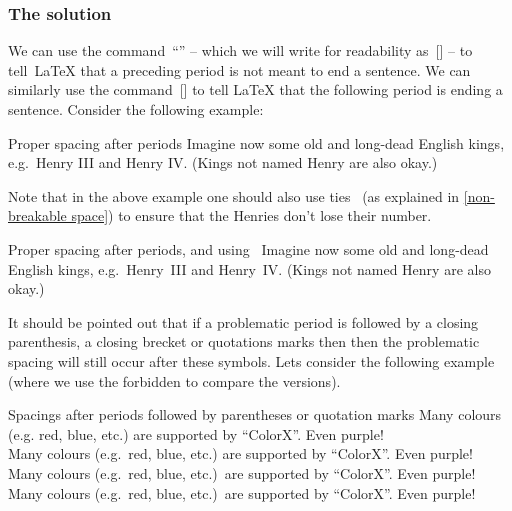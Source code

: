 \subsubsection{The solution}

We can use the command~\enquote{\comname{ }} -- which we will write for readability as~[\comname] -- to tell~{\LaTeX} that a preceding period is not meant to end a sentence.
We can similarly use the command~[\comname] to tell {\LaTeX} that the following period is ending a sentence.
Consider the following example:
\begin{showlatex}{Proper spacing after periods}
Imagine now some old and long-dead English kings, e.g.\ Henry III and Henry IV\@.
(Kings not named Henry are also okay.)
\end{showlatex}
Note that in the above example one should also use ties~\inlinecode{\customtexttilde} (as explained in \cref{non-breakable space}) to ensure that the Henries don’t lose their number.
\begin{showlatex}{Proper spacing after periods, and using~\inlinecode{\customtexttilde}}
Imagine now some old and long-dead English kings, e.g.\ Henry~III and Henry~IV\@.
(Kings not named Henry are also okay.)
\end{showlatex}

It should be pointed out that if a problematic period is followed by a closing parenthesis, a closing brecket or quotations marks then then the problematic spacing will still occur after these symbols.
Lets consider the following example (where we use the forbidden \comname{\tbs} to compare the versions).
\begin{showlatex}{Spacings after periods followed by parentheses or quotation marks}
Many colours (e.g. red, blue, etc.) are supported by \enquote{ColorX}. Even purple! \\
Many colours (e.g.\ red, blue, etc.) are supported by \enquote{ColorX}. Even purple! \\
Many colours (e.g.\ red, blue, etc.)\ are supported by \enquote{ColorX}. Even purple! \\
Many colours (e.g.\ red, blue, etc.)\ are supported by \enquote{ColorX}\@. Even purple!
\end{showlatex}

